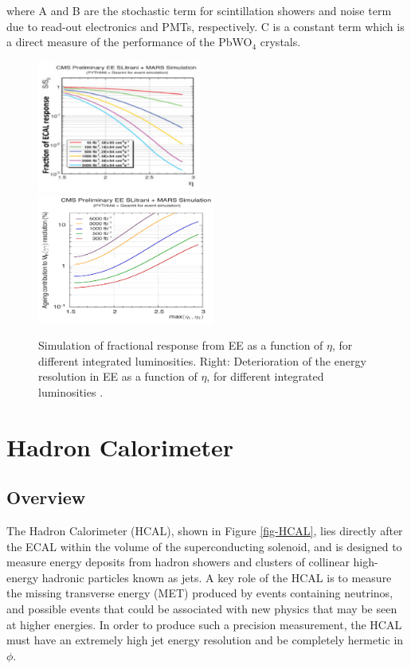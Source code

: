 where A and B are the stochastic term for scintillation showers and noise term due to read-out electronics and PMTs, respectively. C is a constant term which is a direct measure of the performance of the PbWO$_4$ crystals. 

\begin{figure} \label{fig-}
\includegraphics[width=0.48\textwidth]{Figures/EEFractionalResponse.png}
\includegraphics[width=0.52\textwidth]{Figures/EEResolutionDeterioration.png}
\caption{Simulation of fractional response from EE as a function of $\eta$, for different integrated luminosities. Right: Deterioration of the energy resolution in EE as a function of $\eta$, for different integrated luminosities \cite{ECALPerformance}.}
\end{figure}

\section{Hadron Calorimeter} \label{sec-HadronCalorimeter}

\subsection{Overview}

The Hadron Calorimeter (HCAL), shown in Figure \ref{fig-HCAL}, lies directly after the ECAL within the volume of the superconducting solenoid, and is designed to measure energy deposits from hadron showers and clusters of collinear high-energy hadronic particles known as jets. A key role of the HCAL is to measure the missing transverse energy (MET) produced by events containing neutrinos, and possible events that could be associated with new physics that may be seen at higher energies. In order to produce such a precision measurement, the HCAL must have an extremely high jet energy resolution and be completely hermetic in $\phi$. 

